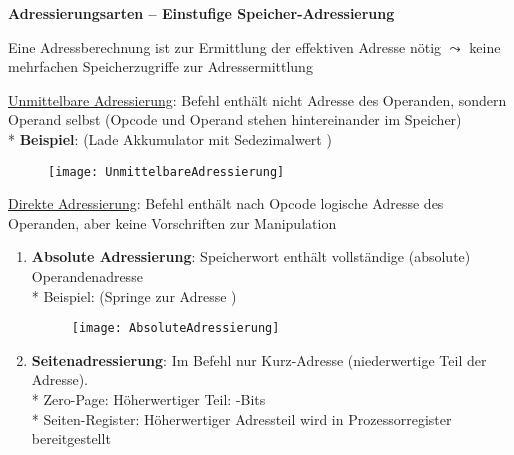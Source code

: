 \textbf{Adressierungsarten -- Einstufige Speicher-Adressierung}
\begin{items}
	\item Eine Adressberechnung ist zur Ermittlung der effektiven Adresse nötig $\leadsto$ keine mehrfachen Speicherzugriffe zur Adressermittlung
	\item \underline{Unmittelbare Adressierung}: Befehl enthält nicht Adresse des Operanden, sondern Operand selbst (Opcode und Operand stehen hintereinander im Speicher) \\* \textbf{Beispiel}:  (Lade Akkumulator mit Sedezimalwert )
		\begin{figure}[H]
		  \centering
		  \texttt{[image: UnmittelbareAdressierung]}
		  \label{UnmittelbareAdressierung}
		\end{figure}
	\item \underline{Direkte Adressierung}: Befehl enthält nach Opcode logische Adresse des Operanden, aber keine Vorschriften zur Manipulation
	\begin{enumerate}
		\item \textbf{Absolute Adressierung}: Speicherwort enthält vollständige (absolute) Operandenadresse \\* Beispiel:  (Springe zur Adresse )
		\begin{figure}[H]
		  \centering
		  \texttt{[image: AbsoluteAdressierung]}
		  \label{AbsoluteAdressierung}
		\end{figure}
		\item \textbf{Seitenadressierung}: Im Befehl nur Kurz-Adresse (niederwertige Teil der Adresse). \\* Zero-Page: Höherwertiger Teil: -Bits \\* Seiten-Register: Höherwertiger Adressteil wird in Prozessorregister bereitgestellt
	\end{enumerate}


\end{items}

